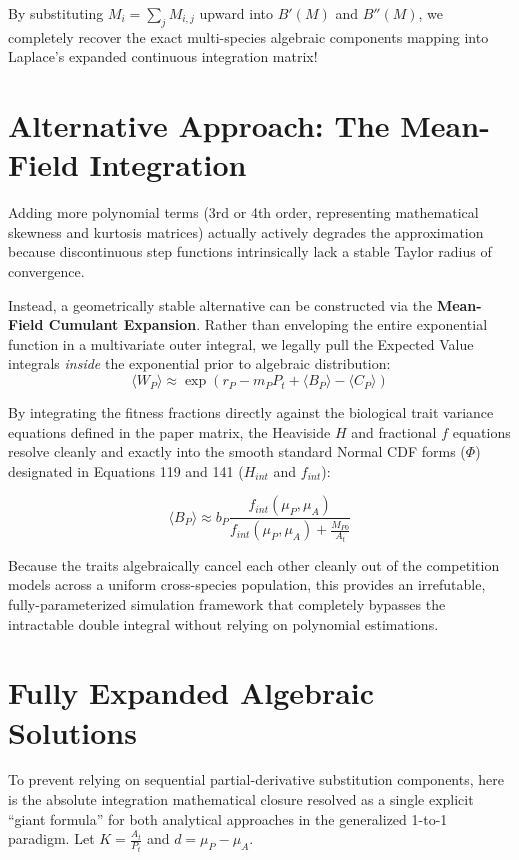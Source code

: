 \documentclass{article}
\begin{document}
By substituting $M_i = \sum_{j} M_{i,j}$ upward into $B'(M)$ and $B''(M)$, we completely recover the exact multi-species algebraic components mapping into Laplace's expanded continuous integration matrix!


\section{Alternative Approach: The Mean-Field Integration}
Adding more polynomial terms (3rd or 4th order, representing mathematical skewness and kurtosis matrices) actually actively degrades the approximation because discontinuous step functions intrinsically lack a stable Taylor radius of convergence.

Instead, a geometrically stable alternative can be constructed via the \textbf{Mean-Field Cumulant Expansion}. Rather than enveloping the entire exponential function in a multivariate outer integral, we legally pull the Expected Value integrals \textit{inside} the exponential prior to algebraic distribution:
$$ \langle W_P \rangle \approx \exp\left( r_P - m_P P_t + \langle B_P \rangle - \langle C_P \rangle \right) $$

By integrating the fitness fractions directly against the biological trait variance equations defined in the paper matrix, the Heaviside $H$ and fractional $f$ equations resolve cleanly and exactly into the smooth standard Normal CDF forms ($\Phi$) designated in Equations 119 and 141 ($H_{int}$ and $f_{int}$):

$$ \langle B_P \rangle \approx b_P \frac{f_{int}(\mu_P, \mu_A)}{f_{int}(\mu_P, \mu_A) + \frac{M_{P0}}{A_t}} $$

Because the traits algebraically cancel each other cleanly out of the competition models across a uniform cross-species population, this provides an irrefutable, fully-parameterized simulation framework that completely bypasses the intractable double integral without relying on polynomial estimations.

\section{Fully Expanded Algebraic Solutions}
To prevent relying on sequential partial-derivative substitution components, here is the absolute integration mathematical closure resolved as a single explicit ``giant formula'' for both analytical approaches in the generalized 1-to-1 paradigm. Let $K = \frac{A_t}{P_t}$ and $d = \mu_P - \mu_A$.
\end{document}

